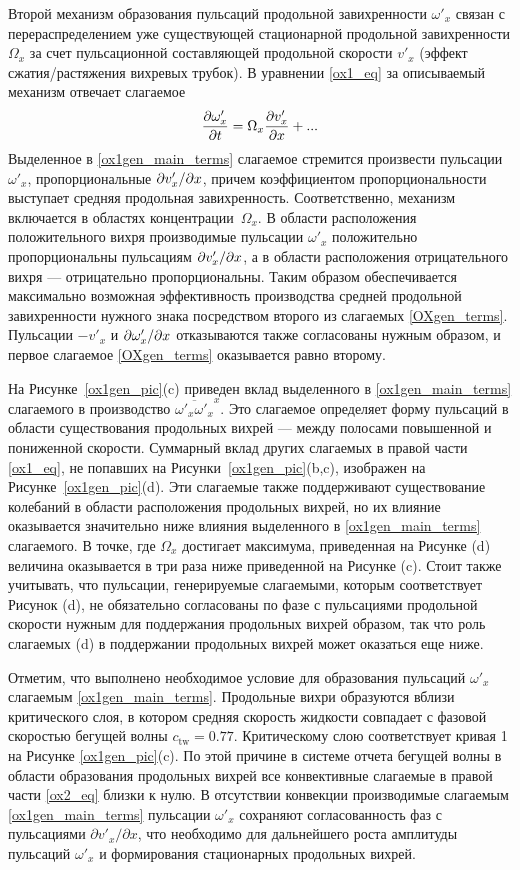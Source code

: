 Второй механизм образования пульсаций продольной завихренности $\omega'_x$ связан с перераспределением уже существующей стационарной продольной завихренности $\Omega_x$ за счет пульсационной составляющей продольной скорости $v'_x$ (эффект сжатия/растяжения вихревых трубок). В уравнении \eqref{ox1_eq} за описываемый механизм отвечает слагаемое
\begin{equation}\label{ox1gen_main_terms}
\frac{\partial \omega'_x}{\partial t} = \Omega_x \frac {\partial v'_x}{\partial x} + ...
\end{equation}
Выделенное в \eqref{ox1gen_main_terms} слагаемое стремится произвести пульсации $\omega'_x$, пропорциональные $\partial v'_x / \partial x$, причем коэффициентом пропорциональности выступает средняя продольная завихренность. Соответственно,  механизм включается в областях концентрации~$\Omega_x$. В области расположения положительного вихря производимые пульсации $\omega'_x$ положительно пропорциональны пульсациям $\partial v'_x / \partial x$, а в области расположения отрицательного вихря --- отрицательно пропорциональны. Таким образом обеспечивается максимально возможная эффективность производства средней продольной завихренности нужного знака посредством второго из слагаемых \eqref{OXgen_terms}. Пульсации $-v'_x$ и $\partial \omega'_x / \partial x$ отказываются также согласованы нужным образом, и первое слагаемое \eqref{OXgen_terms} оказывается равно второму.

На Рисунке~\ref{ox1gen_pic}(c) приведен вклад выделенного в \eqref{ox1gen_main_terms} слагаемого в производство $\overline{\omega'_x \omega'_x}^x$. Это слагаемое определяет форму пульсаций в области существования продольных вихрей --- между полосами повышенной и пониженной скорости. Суммарный вклад других слагаемых в правой части \eqref{ox1_eq}, не попавших на Рисунки~\ref{ox1gen_pic}(b,c), изображен на Рисунке~\ref{ox1gen_pic}(d). Эти слагаемые также поддерживают существование колебаний в области расположения продольных вихрей, но их влияние оказывается значительно ниже влияния выделенного в \eqref{ox1gen_main_terms} слагаемого. В точке, где $\Omega_x$ достигает максимума, приведенная на Рисунке (d) величина оказывается в три раза ниже приведенной на Рисунке (c). Стоит также учитывать, что пульсации, генерируемые слагаемыми, которым соответствует Рисунок (d), не обязательно согласованы по фазе с пульсациями продольной скорости нужным для поддержания продольных вихрей образом, так что роль слагаемых (d) в поддержании продольных вихрей может оказаться еще ниже. 

Отметим, что выполнено необходимое условие для образования пульсаций $\omega'_x$ слагаемым \eqref{ox1gen_main_terms}. Продольные вихри образуются вблизи критического слоя, в котором средняя скорость жидкости совпадает с фазовой скоростью бегущей волны $c_\mathrm{tw} = 0.77$. Критическому слою соответствует кривая 1 на Рисунке \ref{ox1gen_pic}(c). По этой причине в системе отчета бегущей волны в области образования продольных вихрей все конвективные слагаемые в правой части \eqref{ox2_eq} близки к нулю. В отсутствии конвекции производимые слагаемым \eqref{ox1gen_main_terms} пульсации $\omega'_x$ сохраняют согласованность фаз с пульсациями $\partial v'_x / \partial x$, что необходимо для дальнейшего роста амплитуды пульсаций $\omega'_x$ и формирования стационарных продольных вихрей. 

